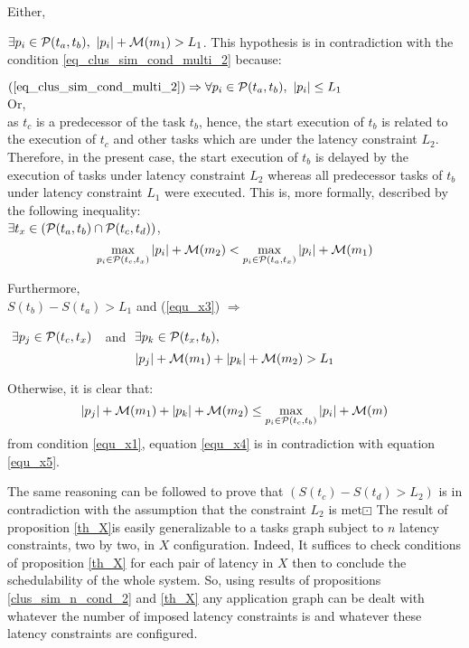 \documentclass{ijcaArticle}
\begin{document}
Either, 

$\exists p_i \in {\cal P}(t_a, t_b), \ |p_i| +  {\cal M}(m_1) > L_1$. This hypothesis is in contradiction with the condition \ref{eq_clus_sim_cond_multi_2}  because:

$ (\ref{eq_clus_sim_cond_multi_2}) \Rightarrow  \forall p_i \in {\cal P}(t_a,t_b), \  |p_i|  \leq L_1$     \\
\vskip1mm
Or, \\ as $t_c$ is a predecessor of the task $t_b$, hence, the start execution of $t_b$ is related to the execution of $t_c$ and other tasks which are under the latency constraint $L_2$. Therefore,  in the present case, the start execution of $t_b$ is delayed by the execution   
of tasks under latency constraint $L_2$ whereas all predecessor tasks of $t_b$ under latency constraint $L_1$ were executed. This is, more formally, described by the following inequality: \\ 
$\exists t_x \in ({\cal P}(t_a,t_b) \cap  {\cal P}(t_c,t_d))$, 
\begin{equation}\label{equ_x3}
 \max\limits_{\substack{p_i \in {\cal P}(t_c, t_x)}} |p_i| +  {\cal M}(m_2) <  \max\limits_{\substack{p_i \in {\cal P}(t_a, t_x)}} |p_i| +  {\cal M}(m_1) 
\end{equation}


Furthermore,\\ $S(t_b)-S(t_a) > L_1$ and (\ref{equ_x3})  $\Rightarrow$ 

$\  \exists  p_j \in {\cal P}(t_c,t_x) \ \ $ and$  \ \ \exists p_k \in {\cal P}(t_x,t_b), $
\begin{equation}\label{equ_x4}
|p_j|+ {\cal M}(m_1) + |p_k| + {\cal M}(m_2)  > L_1
\end{equation}
    

Otherwise, it is clear that:  
\begin{equation}\label{equ_x5}
|p_j|+ {\cal M}(m_1) + |p_k| + {\cal M}(m_2) \leq \max\limits_{p_i \in  {\cal P}(t_c,t_b)} |p_i| +  {\cal M}(m) 
\end{equation}
from condition \ref{equ_x1}, equation \ref{equ_x4} is in contradiction with equation \ref{equ_x5}.  

\vskip1mm 


\noindent The same reasoning can be followed to prove that $(S(t_c)-S(t_d) > L_2)$ is in contradiction with the assumption that the
constraint $L_2$ is met$\boxdot$
\vskip2mm
The result of proposition \ref{th_X}is easily generalizable to a tasks graph subject to $n$ latency constraints, two by two, in $X$ configuration. Indeed, It suffices to
check  conditions of proposition \ref{th_X} for each pair of latency in $X$ then to conclude the schedulability of the whole system.  So, using results of propositions \ref{clus_sim_n_cond_2} and \ref{th_X} any application graph can be dealt with whatever the number of imposed latency constraints is and whatever these latency constraints are configured.  
\end{document}
